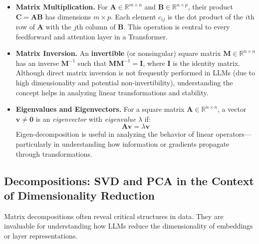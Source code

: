 \begin{itemize}
    \item \textbf{Matrix Multiplication.} 
    For $\mathbf{A} \in \mathbb{R}^{m \times n}$ and $\mathbf{B} \in \mathbb{R}^{n \times p}$, their product $\mathbf{C} = \mathbf{A}\mathbf{B}$ has dimensions $m \times p$. Each element $c_{ij}$ is the dot product of the $i$th row of $\mathbf{A}$ with the $j$th column of $\mathbf{B}$. This operation is central to every feedforward and attention layer in a Transformer.

    \item \textbf{Matrix Inversion.}
    An \textbf{invertible} (or nonsingular) square matrix $\mathbf{M} \in \mathbb{R}^{n \times n}$ has an inverse $\mathbf{M}^{-1}$ such that $\mathbf{M}\mathbf{M}^{-1} = \mathbf{I}$, where $\mathbf{I}$ is the identity matrix. Although direct matrix inversion is not frequently performed in LLMs (due to high dimensionality and potential non-invertibility), understanding the concept helps in analyzing linear transformations and stability.

    \item \textbf{Eigenvalues and Eigenvectors.}
    For a square matrix $\mathbf{A} \in \mathbb{R}^{n \times n}$, a vector $\mathbf{v} \neq \mathbf{0}$ is an \emph{eigenvector} with \emph{eigenvalue} $\lambda$ if:
    \begin{equation}\label{eq:eigenvalue}
    \mathbf{A}\mathbf{v} = \lambda \mathbf{v}
    \end{equation}
    Eigen-decomposition is useful in analyzing the behavior of linear operators—particularly in understanding how information or gradients propagate through transformations.
\end{itemize}

\subsection{Decompositions: SVD and PCA in the Context of Dimensionality Reduction}
\noindent
Matrix decompositions often reveal critical structures in data. They are invaluable for understanding how LLMs reduce the dimensionality of embeddings or layer representations.

